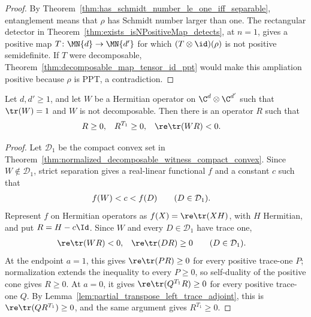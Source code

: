 \begin{proof}
    \leanok
    By Theorem~\ref{thm:has_schmidt_number_le_one_iff_separable}, entanglement
    means that $\rho$ has Schmidt number larger than one. The rectangular
    detector in Theorem~\ref{thm:exists_isNPositiveMap_detects}, at $n=1$,
    gives a positive map $T\colon\MN{d}\to\MN{d'}$ for which
    $(T\otimes\id)(\rho)$ is not positive semidefinite. If $T$ were
    decomposable, Theorem~\ref{thm:decomposable_map_tensor_id_ppt} would make
    this ampliation positive because $\rho$ is PPT, a contradiction.
\end{proof}

\begin{theorem}
    \label{thm:normalized_nondecomposable_witness_ppt_separator}
    \leanok
    Let $d,d'\geq1$, and let $W$ be a Hermitian operator on
    $\C^d\otimes\C^{d'}$ such that $\tr(W)=1$ and $W$ is not decomposable.
    Then there is an operator $R$ such that
    \begin{align}
        R&\geq0,
        &R^{T_1}&\geq0,
        &\re\tr(WR)&<0.
        \notag
    \end{align}
\end{theorem}

\begin{proof}
    \leanok
    Let $\mathcal D_1$ be the compact convex set in
    Theorem~\ref{thm:normalized_decomposable_witness_compact_convex}.
    Since $W\notin\mathcal D_1$, strict separation gives a real-linear
    functional $f$ and a constant $c$ such that
    \begin{align}
        f(W)&<c<f(D) \qquad (D\in\mathcal D_1).
        \notag
    \end{align}
    Represent $f$ on Hermitian operators as $f(X)=\re\tr(XH)$, with $H$
    Hermitian, and put $R=H-c\Id$. Since $W$ and every $D\in\mathcal D_1$
    have trace one,
    \begin{align}
        \re\tr(WR)&<0,
        &\re\tr(DR)&\geq0 \qquad (D\in\mathcal D_1).
        \notag
    \end{align}
    At the endpoint $a=1$, this gives $\re\tr(PR)\geq0$ for every positive
    trace-one $P$; normalization extends the inequality to every $P\geq0$,
    so self-duality of the positive cone gives $R\geq0$. At $a=0$, it gives
    $\re\tr(Q^{T_1}R)\geq0$ for every positive trace-one $Q$. By
    Lemma~\ref{lem:partial_transpose_left_trace_adjoint}, this is
    $\re\tr(QR^{T_1})\geq0$, and the same argument gives $R^{T_1}\geq0$.
\end{proof}


